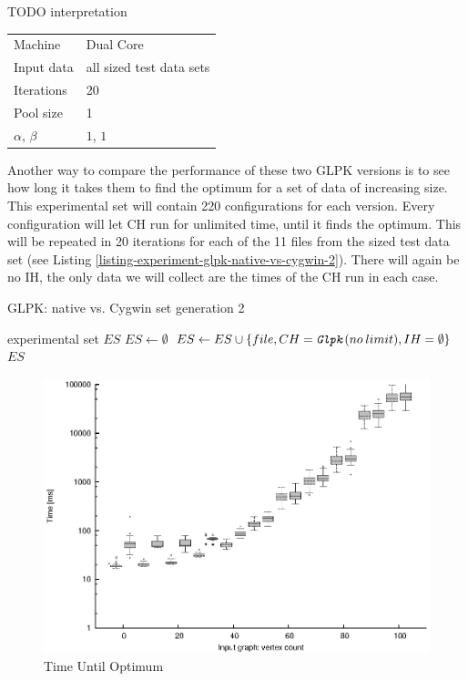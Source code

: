 TODO interpretation

\begin{center}
\bigskip
\begin{tabular}{| l | l |}
  \hline
  \hline
  Machine           & Dual Core \\
  Input data        & all sized test data sets \\
  Iterations        & 20 \\
  Pool size         & 1 \\
  $\alpha$, $\beta$ & $1$, $1$ \\
  \hline
\end{tabular}
\bigskip
\end{center}

Another way to compare the performance of these two GLPK versions is to see how long it takes them to find the optimum for a set of data of increasing size. This experimental set will contain 220 configurations for each version. Every configuration will let  CH run for unlimited time, until it finds the optimum. This will be repeated in 20 iterations for each of the 11 files from the sized test data set (see Listing \ref{listing-experiment-glpk-native-vs-cygwin-2}). There will again be no IH, the only data we will collect are the times of the CH run in each case.

\begin{algorithm}
\caption{GLPK: native vs. Cygwin set generation 2}
\label{listing-experiment-glpk-native-vs-cygwin-2}
\begin{algorithmic}
\ENSURE experimental set $ES$
\STATE $ES \gets \emptyset$
    \STATE $ES \gets ES \cup \{file, CH = \texttt{\textit{Glpk}}(no\:limit), IH = \emptyset\}$
  \ENDFOR
\ENDFOR
\RETURN $ES$
\end{algorithmic}
\end{algorithm}

\begin{figure}
  \caption{Time Until Optimum}
  \label{image-experiment-time-until-optimum}
  \centering
    \includegraphics[width=\textwidth]{images/experiments/time-till-optimum}
\end{figure}

